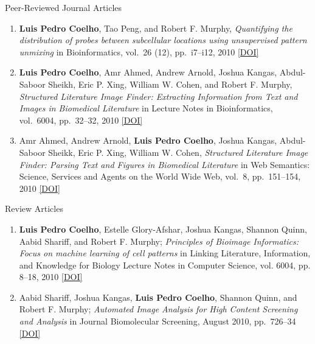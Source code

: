 \documentclass{article}
\renewcommand\subsection[1]{%
    \par\vspace{.1em}\penalty-100%
    {\hspace{1em}\subsubhead #1}%
    \par\vspace{.2em}\penalty100%
}
\newcommand\showdoi[1]{%
    \href{http://dx.doi.org/#1}{[DOI]}%
}
\begin{document}
\subsection{Peer-Reviewed Journal Articles}
\begin{enumerate}
\item \textbf{Luis Pedro Coelho}, Tao Peng, and Robert F. Murphy,
\emph{Quantifying the distribution of probes between subcellular locations
using unsupervised pattern unmixing} in Bioinformatics, vol.\ 26 (12), pp.\
i7--i12, 2010 \showdoi{10.1093/bioinformatics/btq220}

\item \textbf{Luis Pedro Coelho}, Amr Ahmed, Andrew Arnold, Joshua Kangas,
Abdul-Saboor Sheikh, Eric P. Xing, William W. Cohen, and Robert F. Murphy,
\emph{Structured Literature Image Finder: Extracting Information from Text and
Images in Biomedical Literature} in Lecture Notes in Bioinformatics, vol.\
6004, pp.\ 32--32, 2010 \showdoi{10.1007/978-3-642-13131-8_4}

\item Amr Ahmed, Andrew Arnold, \textbf{Luis Pedro Coelho}, Joshua Kangas,
Abdul-Saboor Sheikk, Eric P. Xing, William W. Cohen, \emph{Structured
Literature Image Finder: Parsing Text and Figures in Biomedical Literature} in
Web Semantics: Science, Services and Agents on the World Wide Web, vol.\ 8,
pp.\ 151--154, 2010 \showdoi{10.1016/j.websem.2010.04.002}

\end{enumerate}

\subsection{Review Articles}
\begin{enumerate}
\item \textbf{Luis Pedro Coelho}, Estelle Glory-Afshar, Joshua Kangas, Shannon
Quinn, Aabid Shariff, and Robert F. Murphy; \emph{Principles of Bioimage
Informatics: Focus on machine learning of cell patterns} in Linking Literature,
Information, and Knowledge for Biology Lecture Notes in Computer Science, vol.
6004, pp. 8--18, 2010 \showdoi{10.1007/978-3-642-13131-8_2}

\item Aabid Shariff, Joshua Kangas, \textbf{Luis Pedro Coelho}, Shannon Quinn,
and Robert F. Murphy; \emph{Automated Image Analysis for High Content Screening
and Analysis} in Journal Biomolecular Screening, August 2010, pp.\ 726--34
\showdoi{10.1177/1087057110370894}

\end{enumerate}
\end{document}
